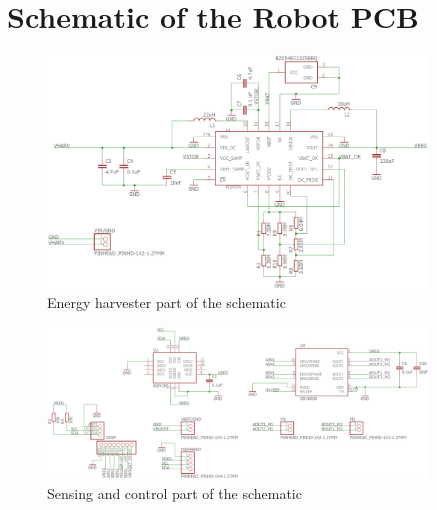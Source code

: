 \chapter{Schematic of the Robot PCB}
\label{app:schematic_robot}

\begin{figure}[h!]
	\centering
	\includegraphics[width=0.9\textwidth]{pics/pcb_harvester_schematic.png}
	\caption{Energy harvester part of the schematic}
	\label{fig:pcb_harvester_schematic}
\end{figure}

\begin{figure}[h!]
	\centering
	\includegraphics[width=0.9\textwidth]{pics/pcb_sens_ctrl_schematic.png}
	\caption{Sensing and control part of the schematic}
	\label{fig:pcb_sens_ctrl_schematic}
\end{figure}